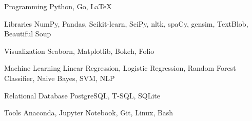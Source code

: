 

\begin{cvskills}
	
	\cvskill
	{Programming} %
	{Python, Go, LaTeX} %
	
	\cvskill
	{Libraries} %
	{NumPy, Pandas, Scikit-learn, SciPy, nltk, spaCy, gensim, TextBlob, Beautiful Soup
	} %
	
	\cvskill
	{Visualization} %
	{Seaborn, Matplotlib, Bokeh, Folio} %
	
	\cvskill
	{Machine Learning} %
	{Linear Regression, Logistic Regression, Random Forest Classifier, 
		Naive Bayes, SVM, NLP} %
	
	\cvskill
	{Relational Database} %
	{PostgreSQL, T-SQL, SQLite} %
	
	\cvskill
	{Tools} %
	{Anaconda, Jupyter Notebook, Git, Linux, Bash} %
	
	
	\vspace*{-12mm}
\end{cvskills}
